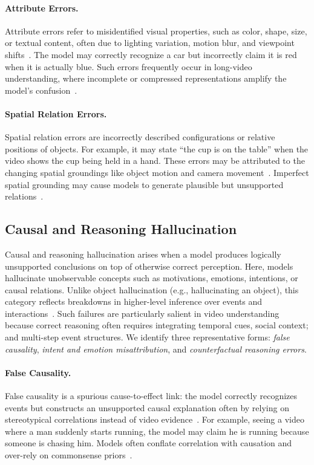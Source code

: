 \documentclass[10pt]{article} %
\begin{document}
\paragraph{Attribute Errors.}
Attribute errors refer to misidentified visual properties, such as color, shape, size, or textual content, often due to lighting variation, motion blur, and viewpoint shifts~\citep{rawal2025argus, patraucean2023perception, yang2025mesh}. The model may correctly recognize a car but incorrectly claim it is red when it is actually blue. Such errors frequently occur in long-video understanding, where incomplete or compressed representations amplify the model's confusion~\citep{wang2024videoagent, zou2024seconds}.

\paragraph{Spatial Relation Errors.}
Spatial relation errors are incorrectly described configurations or relative positions of objects. For example, it may state ``the cup is on the table'' when the video shows the cup being held in a hand. These errors may be attributed to the changing spatial groundings like object motion and camera movement~\citep{wang2024videohallucer}. Imperfect spatial grounding may cause models to generate plausible but unsupported relations~\citep{wang2025spacevllm, ouyang2025spacer, tang2025video}.

\subsection{Causal and Reasoning Hallucination}\label{subsec:reasoning-hallucination}

Causal and reasoning hallucination arises when a model produces logically unsupported conclusions on top of otherwise correct perception. Here, models hallucinate unobservable concepts such as motivations, emotions, intentions, or causal relations. Unlike object hallucination (e.g., hallucinating an object), this category reflects breakdowns in higher-level inference over events and interactions~\citep{jiang2025videop2r}. Such failures are particularly salient in video understanding because correct reasoning often requires integrating temporal cues, social context; and multi-step event structures. We identify three representative forms: \emph{false causality}, \emph{intent and emotion misattribution}, and \emph{counterfactual reasoning errors}.

\paragraph{False Causality.}
False causality is a spurious cause-to-effect link: the model correctly recognizes events but constructs an unsupported causal explanation often by relying on stereotypical correlations instead of video evidence~\citep{guda2024causal, li2022representation, chen2024mecd}. For example, seeing a video where a man suddenly starts running, the model may claim he is running because someone is chasing him. Models often conflate correlation with causation and over-rely on commonsense priors~\citep{liu2023vcd, wei2023visual}.
\end{document}
